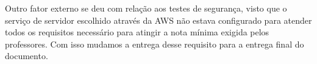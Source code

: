 \documentclass[
    12pt,               %
    openright,          %
    oneside,
    a4paper,            %
    BIBLATEX,           %
    TODO,               %
    english,            %
    brazil              %
    ]{ifsp-spo-inf-ctds}
\begin{document}
    Outro fator externo se deu com relação aos testes de segurança, visto que o serviço de servidor escolhido através da AWS não estava configurado para atender todos os requisitos necessário para atingir a nota mínima exigida pelos professores. Com isso mudamos a entrega desse requisito para a entrega final do documento.




\postextual


%

\end{document}
